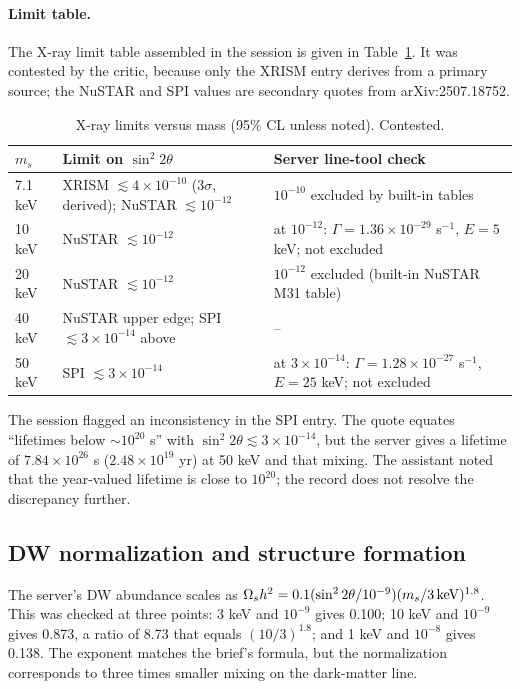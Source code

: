 \documentclass[11pt,a4paper]{article}
\begin{document}
\paragraph{Limit table.} The X-ray limit table assembled in the session is given in Table~\ref{tab:xray}. It was contested by the critic, because only the XRISM entry derives from a primary source; the NuSTAR and SPI values are secondary quotes from arXiv:2507.18752.

\begin{table}[h]
\centering
\begin{tabular}{lll}
\toprule
$m_s$ & Limit on $\sin^2 2\theta$ & Server line-tool check\\
\midrule
7.1 keV & XRISM $\lesssim4\times10^{-10}$ (3$\sigma$, derived); NuSTAR $\lesssim10^{-12}$ & $10^{-10}$ excluded by built-in tables\\
10 keV & NuSTAR $\lesssim10^{-12}$ & at $10^{-12}$: $\Gamma=1.36\times10^{-29}$ s$^{-1}$, $E=5$ keV; not excluded\\
20 keV & NuSTAR $\lesssim10^{-12}$ & $10^{-12}$ excluded (built-in NuSTAR M31 table)\\
40 keV & NuSTAR upper edge; SPI $\lesssim3\times10^{-14}$ above & --\\
50 keV & SPI $\lesssim3\times10^{-14}$ & at $3\times10^{-14}$: $\Gamma=1.28\times10^{-27}$ s$^{-1}$, $E=25$ keV; not excluded\\
\bottomrule
\end{tabular}
\caption{X-ray limits versus mass (95\% CL unless noted). Contested.}
\label{tab:xray}
\end{table}

The session flagged an inconsistency in the SPI entry. The quote equates ``lifetimes below $\sim10^{20}$ s'' with $\sin^2 2\theta\lesssim3\times10^{-14}$, but the server gives a lifetime of $7.84\times10^{26}$ s ($2.48\times10^{19}$ yr) at 50 keV and that mixing. The assistant noted that the year-valued lifetime is close to $10^{20}$; the record does not resolve the discrepancy further.

\subsection{DW normalization and structure formation}
The server's DW abundance scales as $\Omega_s h^2=0.1(\sin^2 2\theta/10^{-9})(m_s/3\,{\rm keV})^{1.8}$. This was checked at three points: 3 keV and $10^{-9}$ gives 0.100; 10 keV and $10^{-9}$ gives 0.873, a ratio of 8.73 that equals $(10/3)^{1.8}$; and 1 keV and $10^{-8}$ gives 0.138. The exponent matches the brief's formula, but the normalization corresponds to three times smaller mixing on the dark-matter line.
\end{document}
